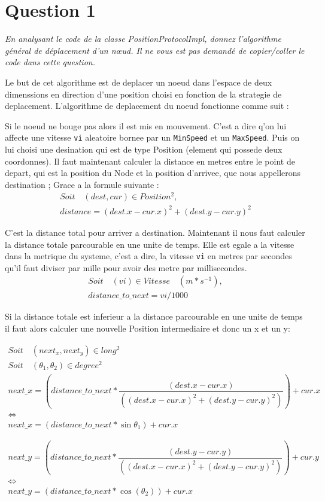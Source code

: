 \documentclass[11pt,a4paper,sans]{report}
\begin{document}
	\section{Question 1}
	\textit{En analysant le code de la classe PositionProtocolImpl, donnez l’algorithme général de déplacement d’un nœud. Il ne vous est pas demandé de copier/coller le code dans cette question.}
	\par Le but de cet algorithme est de deplacer un noeud dans l'espace de deux dimenssions en direction d'une position choisi en fonction de la strategie de deplacement.  L'algorithme de deplacement du noeud fonctionne comme suit :
	\par Si le noeud ne bouge pas alors il est mis en mouvement. C'est a dire q'on lui affecte une vitesse \texttt{vi} aleatoire bornee par un \texttt{MinSpeed} et un \texttt{MaxSpeed}. Puis on lui choisi une desination qui est de type Position (element qui possede deux coordonnes). Il faut maintenant calculer la distance en metres entre le point de depart, qui est la position du Node et la position d'arrivee, que nous appellerons destination ; Grace a la formule suivante :
	\begin{gather}
		Soit \quad  (dest, cur) \in Position^2, \\
		distance = (dest.x - cur.x)^2 + (dest.y - cur.y)^2 
	\end{gather}
	\par C'est la distance total pour arriver a destination. Maintenant il nous faut calculer la distance totale parcourable en une unite de temps. Elle est egale a la vitesse dans la metrique du systeme, c'est a dire, la vitesse \texttt{vi} en metres par secondes qu'il faut diviser par mille pour avoir des metre par millisecondes.
	\begin{gather}
		Soit  \quad  (vi) \in Vitesse \quad (m*s^{-1}), \\
		distance\_to\_next= vi / 1000
	\end{gather}
	\par Si la distance totale est inferieur a la distance parcourable en une unite de temps il faut alors calculer une nouvelle Position intermediaire et donc un x et un y:

	\begin{gather}
		Soit  \quad  (next_x,next_y) \in long^2 \\
		Soit  \quad  (\theta_{1}, \theta_{2}) \in degree^2 \\
		next\_x =  (distance\_to\_next * \dfrac{(dest.x - cur.x)}{((dest.x - cur.x)^2 + (dest.y - cur.y)^2)}) + cur.x \\
		\Longleftrightarrow \\
		next\_x =  (distance\_to\_next * \sin{\theta_{1}}) + cur.x \\
		\\
		\\
		next\_y =  (distance\_to\_next * \dfrac{(dest.y - cur.y)}{((dest.x - cur.x)^2 + (dest.y - cur.y)^2)}) + cur.y \\
		\Longleftrightarrow \\
		next\_y =  (distance\_to\_next * \cos(\theta_{2})) + cur.x \\
	\end{gather}
\end{document}
